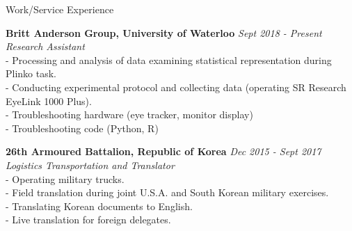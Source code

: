 \documentclass{resume} %
\begin{document}
\begin{rSection}{Work/Service Experience}

{\bf Britt Anderson Group, University of Waterloo} \hfill {\em Sept 2018 - Present} 
\\{\textit{Research Assistant}}
\\- Processing and analysis of data examining statistical representation during Plinko task.
\\- Conducting experimental protocol and collecting data (operating SR Research EyeLink 1000 Plus).
\\- Troubleshooting hardware (eye tracker, monitor display)
\\- Troubleshooting code (Python, R)


{\bf 26th Armoured Battalion, Republic of Korea } \hfill {\em Dec 2015 - Sept 2017} 
\\{\textit{Logistics Transportation and Translator}}
\\- Operating military trucks.
\\- Field translation during joint U.S.A. and South Korean military exercises.
\\- Translating Korean documents to English.
\\- Live translation for foreign delegates.




\end{rSection}




\end{document}
